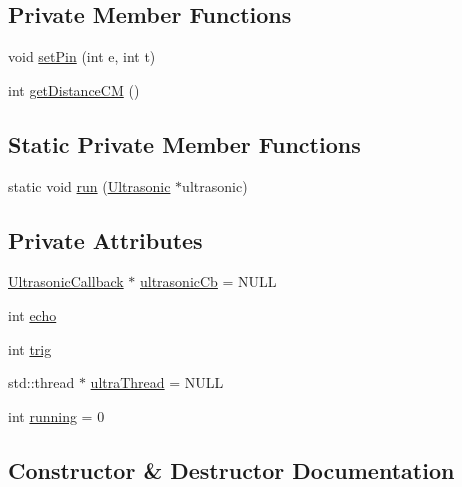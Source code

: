 \subsection*{Private Member Functions}
\begin{DoxyCompactItemize}
\item 
void \hyperlink{classUltrasonic_a5ceb2f35156c7e6b6c22538b090b1923}{set\+Pin} (int e, int t)
\item 
int \hyperlink{classUltrasonic_a7af95864d8b2b58d56e661e0fcb4ca8b}{get\+Distance\+CM} ()
\end{DoxyCompactItemize}
\subsection*{Static Private Member Functions}
\begin{DoxyCompactItemize}
\item 
static void \hyperlink{classUltrasonic_ac1df91b01624260ce4c19126e3aa0160}{run} (\hyperlink{classUltrasonic}{Ultrasonic} $\ast$ultrasonic)
\end{DoxyCompactItemize}
\subsection*{Private Attributes}
\begin{DoxyCompactItemize}
\item 
\hyperlink{classUltrasonicCallback}{Ultrasonic\+Callback} $\ast$ \hyperlink{classUltrasonic_a00cb643880cff1ac6b3b429e92c5bba9}{ultrasonic\+Cb} = N\+U\+LL
\item 
int \hyperlink{classUltrasonic_a2979ecabfbda7cae5394eef20c862d99}{echo}
\item 
int \hyperlink{classUltrasonic_a90f3f5b30f09038811bcc5231efdc619}{trig}
\item 
std\+::thread $\ast$ \hyperlink{classUltrasonic_a830f5b7f4e3de362e1b90eb5d6f3844b}{ultra\+Thread} = N\+U\+LL
\item 
int \hyperlink{classUltrasonic_a18088bcacb3c6080c08c2ea105313f65}{running} = 0
\end{DoxyCompactItemize}


\subsection{Constructor \& Destructor Documentation}
\mbox{\label{classUltrasonic_a306b1ccdce9cc1bfa3ef4a51502e7d44}} 
